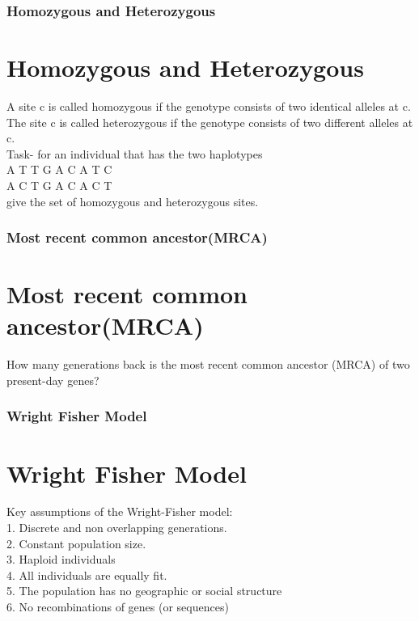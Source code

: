 \documentclass{beamer}
\begin{document}
    \begin{frame}
        \frametitle{Homozygous and Heterozygous}
        \section*{Homozygous and Heterozygous}

        A site c is called homozygous if the genotype consists of two identical alleles at c. The site c is called heterozygous if the genotype consists of two different alleles at c. \\
        Task- for an individual that has the two haplotypes \\
        A T T G A C A T C \\
        A C T G A C A C T \\
        give the set of homozygous and heterozygous sites. 
    
    \end{frame}
    \begin{frame}
        \frametitle{Most recent common ancestor(MRCA)}
        \section*{Most recent common ancestor(MRCA)}
        How many generations back is the most recent common ancestor (MRCA) of two present-day genes?
        
    
    \end{frame}
    \begin{frame}
        \frametitle{Wright Fisher Model}
        \section*{Wright Fisher Model}
        Key assumptions of the Wright-Fisher model: \\
        1. Discrete and non overlapping generations. \\
        2. Constant population size. \\
        3. Haploid individuals \\
        4. All individuals are equally fit. \\
        5. The population has no geographic or social structure\\
        6. No recombinations of genes (or sequences)



    
        
    
    \end{frame}
\end{document}

